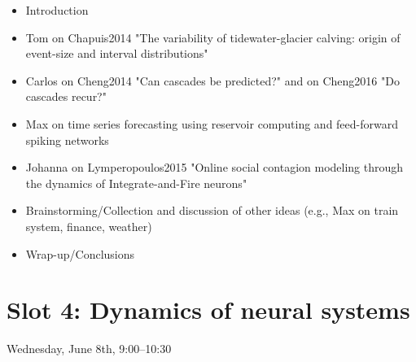 \documentclass[10pt, a4paper,twoside,american]{article}
\begin{document}
\begin{enumerate}[resume]
\begin{itemize}
  	\item Introduction
  	\item Tom on Chapuis2014 "The variability of tidewater-glacier calving: origin of event-size and interval distributions"
  	\item Carlos on Cheng2014 "Can cascades be predicted?" and on Cheng2016 "Do cascades recur?"
  	\item Max on time series forecasting using reservoir computing and feed-forward spiking networks
  	\item Johanna on Lymperopoulos2015 "Online social contagion modeling through the dynamics of Integrate-and-Fire neurons"
  	\item Brainstorming/Collection and discussion of other ideas (e.g., Max on train system, finance, weather)
  	\item Wrap-up/Conclusions
  \end{itemize}
\end{enumerate}

\section*{Slot 4: Dynamics of neural systems}
Wednesday, June 8th, 9:00--10:30
\end{document}
